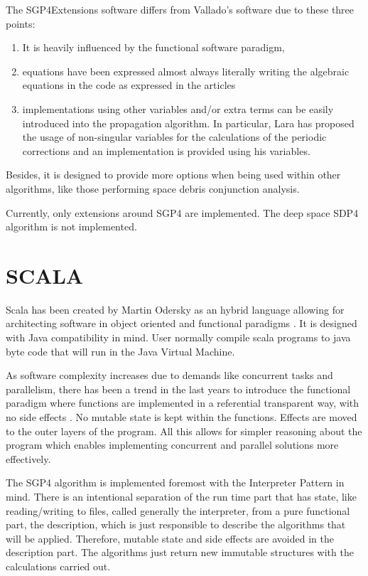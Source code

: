 \documentclass{article}
\begin{document}
The SGP4Extensions software differs from Vallado's software due to these three points:
\begin{enumerate}
  \item  It is heavily influenced by the functional software paradigm,
  \item  equations have been expressed almost always literally writing the algebraic
equations in the code as expressed in the articles
  \item  implementations using other variables and/or extra terms can be easily introduced
into the propagation algorithm. In particular, Lara has proposed the usage of non-singular variables for the
calculations of the periodic corrections and an implementation is provided using his variables.
\end{enumerate}
Besides, it is designed to provide more options when being used within other algorithms,
like those performing space debris conjunction analysis.

Currently, only extensions around SGP4 are implemented. The deep space SDP4 algorithm is not
implemented.

\section{SCALA}
\label{sec:scala}

Scala has been created by Martin Odersky as an hybrid language allowing for architecting software in
object oriented and functional paradigms \cite{scala-overview-tech-report}.
It is designed with Java compatibility in mind. User normally compile scala programs
to java byte code that will run in the Java Virtual Machine.

As software complexity increases due to demands like concurrent tasks and parallelism,
there has been a trend in the last years to introduce the functional paradigm where
functions are implemented in a referential transparent way, with no side effects \cite{ChBj}.
No mutable state is kept within the functions. Effects are moved to the outer layers
of the program. All this allows for simpler reasoning about the program which enables
implementing concurrent and parallel solutions more effectively.

The SGP4 algorithm is implemented foremost with the Interpreter Pattern in mind.
There is an intentional
separation of the run time part that has state, like reading/writing to files, called
generally the interpreter, from a pure functional part, the description, which is just
responsible to describe the algorithms that will be applied.
Therefore, mutable state and side effects are avoided in the description part.
The algorithms just return new immutable structures
with the calculations carried out.
\end{document}
